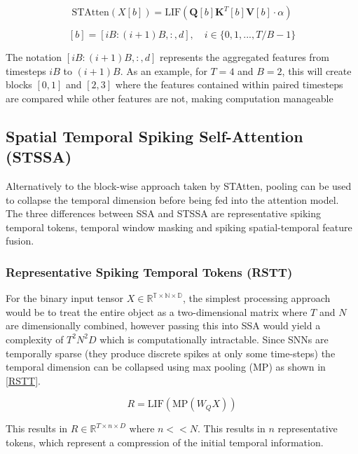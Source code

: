 \documentclass[../main.tex]{subfiles}
\begin{document}
\begin{equation}\label{STAtten_model}
\text{STAtten}(X[b])=\text{LIF}(\mathbf{Q}[b]\mathbf{K}^T[b]\mathbf{V}[b]\cdot\alpha)
\end{equation}

\begin{equation}\label{STAtten_b}
[b]=[iB:(i+1)B,:,d],\quad i\in\{0,1,...,T/B-1\}
\end{equation}

\par The notation $[iB:(i+1)B,:,d]$ represents the aggregated features from timesteps $iB$ to $(i+1)B$\cite{STAtten}. As an example, for $T=4$ and $B=2$, this will create blocks $[0,1]$ and $[2,3]$ where the features contained within paired timesteps are compared while other features are not, making computation manageable\cite{STAtten}

\subsection{Spatial Temporal Spiking Self-Attention (STSSA)}
Alternatively to the block-wise approach taken by STAtten, pooling can be used to collapse the temporal dimension before being fed into the attention model. The three differences between SSA and STSSA are representative spiking temporal tokens, temporal window masking and spiking spatial-temporal feature fusion\cite{STSSA}.

\subsubsection{Representative Spiking Temporal Tokens (RSTT)}
For the binary input tensor $X\in\mathbb{R^{T\times N\times D}}$, the simplest processing approach would be to treat the entire object as a two-dimensional matrix where $T$ and $N$ are dimensionally combined\cite{STSSA}, however passing this into SSA would yield a complexity of $T^2N^2D$ which is computationally intractable. Since SNNs are temporally sparse (they produce discrete spikes at only some time-steps) the temporal dimension can be collapsed using max pooling (MP) as shown in \eqref{RSTT}\cite{STSSA}.

\begin{equation}\label{RSTT}
R=\text{LIF}(\text{MP}(W_QX))
\end{equation}

\par This results in $R\in\mathbb{R}^{T\times n\times D}$ where $n<<N$.\cite{STSSA} This results in $n$ representative tokens, which represent a compression of the initial temporal information.
\end{document}
